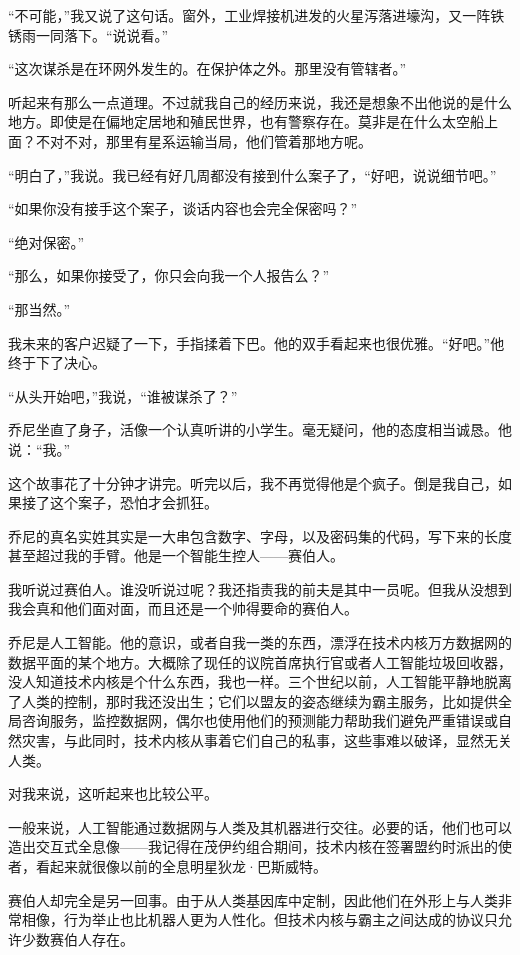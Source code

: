 \documentclass[AutoFakeBold=true]{book}
\begin{document}
``不可能，''我又说了这句话。窗外，工业焊接机进发的火星泻落进壕沟，又一阵铁锈雨一同落下。``说说看。''

``这次谋杀是在环网外发生的。在保护体之外。那里没有管辖者。''

听起来有那么一点道理。不过就我自己的经历来说，我还是想象不出他说的是什么地方。即使是在偏地定居地和殖民世界，也有警察存在。莫非是在什么太空船上面？不对不对，那里有星系运输当局，他们管着那地方呢。

``明白了，''我说。我已经有好几周都没有接到什么案子了，``好吧，说说细节吧。''

``如果你没有接手这个案子，谈话内容也会完全保密吗？''

``绝对保密。''

``那么，如果你接受了，你只会向我一个人报告么？''

``那当然。''

我未来的客户迟疑了一下，手指揉着下巴。他的双手看起来也很优雅。``好吧。''他终于下了决心。

``从头开始吧，''我说，``谁被谋杀了？''

乔尼坐直了身子，活像一个认真听讲的小学生。毫无疑问，他的态度相当诚恳。他说：``我。''

\vspace*{1em}

这个故事花了十分钟才讲完。听完以后，我不再觉得他是个疯子。倒是我自己，如果接了这个案子，恐怕才会抓狂。

乔尼的真名实姓其实是一大串包含数字、字母，以及密码集的代码，写下来的长度甚至超过我的手臂。他是一个智能生控人——赛伯人。

我听说过赛伯人。谁没听说过呢？我还指责我的前夫是其中一员呢。但我从没想到我会真和他们面对面，而且还是一个帅得要命的赛伯人。

乔尼是人工智能。他的意识，或者自我一类的东西，漂浮在技术内核万方数据网的数据平面的某个地方。大概除了现任的议院首席执行官或者人工智能垃圾回收器，没人知道技术内核是个什么东西，我也一样。三个世纪以前，人工智能平静地脱离了人类的控制，那时我还没出生；它们以盟友的姿态继续为霸主服务，比如提供全局咨询服务，监控数据网，偶尔也使用他们的预测能力帮助我们避免严重错误或自然灾害，与此同时，技术内核从事着它们自己的私事，这些事难以破译，显然无关人类。

对我来说，这听起来也比较公平。

一般来说，人工智能通过数据网与人类及其机器进行交往。必要的话，他们也可以造出交互式全息像——我记得在茂伊约组合期间，技术内核在签署盟约时派出的使者，看起来就很像以前的全息明星狄龙·巴斯威特。

赛伯人却完全是另一回事。由于从人类基因库中定制，因此他们在外形上与人类非常相像，行为举止也比机器人更为人性化。但技术内核与霸主之间达成的协议只允许少数赛伯人存在。
\end{document}
